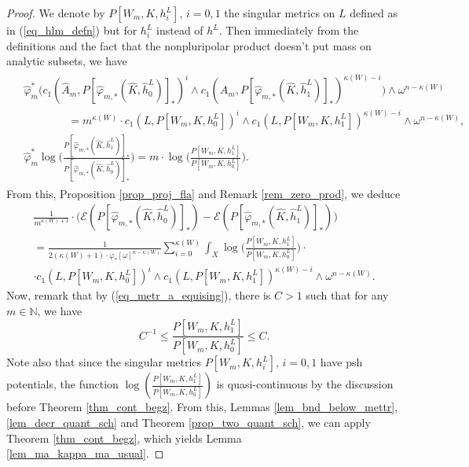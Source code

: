 \documentclass[12pt]{article}
\numberwithin{equation}{section}
\theoremstyle{theorem}
\theoremstyle{definition}
\theoremstyle{remark}
\newcommand{\nat}{\mathbb{N}}
\begin{document}
	\begin{proof}
		We denote by $P[W_m, K, h^L_i]$, $i = 0, 1$ the singular metrics on $L$ defined as in (\ref{eq_hlm_defn}) but for $h^L_i$ instead of $h^L$.
		Then immediately from the definitions and the fact that the nonpluripolar product doesn't put mass on analytic subsets, we have
		\begin{multline}
		\begin{aligned}
			&
			\widehat{\varphi}_m^* \Big( c_1(\widehat{A}_m, P[\widehat{\varphi}_{m, *} (\widehat{K}, \widehat{h}^L_0)]_*)^i \wedge c_1(\widehat{A}_m, P[\widehat{\varphi}_{m, *} (\widehat{K}, \widehat{h}^L_1)]_*)^{\kappa(W) - i} \Big) \wedge \omega^{n - \kappa(W)}
			\\
			&
			\qquad \qquad 
			=
			m^{\kappa(W)} \cdot c_1(L, P[W_m, K, h^L_0])^i \wedge c_1(L, P[W_m, K, h^L_1])^{\kappa(W) - i}  \wedge \omega^{n - \kappa(W)},
			\\
			&
			\widehat{\varphi}_m^*
			\log\Big( \frac{P[\widehat{\varphi}_{m, *} (\widehat{K}, \widehat{h}^L_1)]_*}{P[\widehat{\varphi}_{m, *} (\widehat{K}, \widehat{h}^L_0)]_*} \Big)
			=
			m
			\cdot
			\log\Big( \frac{P[W_m, K, h^L_1]}{P[W_m, K, h^L_0]} \Big).
		\end{aligned}
		\end{multline}
		From this, Proposition \ref{prop_proj_fla} and Remark \ref{rem_zero_prod}, we deduce
		\begin{multline}
			\frac{1}{m^{\kappa(W) + 1}}
			\cdot
			\Big(
			\mathscr{E}(P[\widehat{\varphi}_{m, *} (\widehat{K}, \widehat{h}^L_0)]_*) - \mathscr{E}(P[\widehat{\varphi}_{m, *} (\widehat{K}, \widehat{h}^L_1)]_*)
			\Big)
			\\
			=
			\frac{1}{2(\kappa(W) + 1) \cdot \varphi_{*} [\omega]^{n - \kappa(W)}}
			\sum_{i = 0}^{\kappa(W)} \int_{X} \log\Big( \frac{P[W_m, K, h^L_1]}{P[W_m, K, h^L_0]} \Big)
			\cdot
			\\
			 \cdot c_1(L, P[W_m, K, h^L_0])^i \wedge c_1(L, P[W_m, K, h^L_1])^{\kappa(W) - i}  \wedge \omega^{n - \kappa(W)}.
		\end{multline}
		Now, remark that by (\ref{eq_metr_a_equising}), there is $C > 1$ such that for any $m \in \nat$, we have
		\begin{equation}
			C^{-1}
			\le
			\frac{P[W_m, K, h^L_1]}{P[W_m, K, h^L_0]}
			\leq
			C.
		\end{equation}
		Note also that since the singular metrics $P[W_m, K, h^L_i]$, $i = 0, 1$ have psh potentials, the function $\log( \frac{P[W_m, K, h^L_1]}{P[W_m, K, h^L_0]})$ is quasi-continuous by the discussion before Theorem \ref{thm_cont_begz}.
		From this, Lemmas \ref{lem_bnd_below_mettr}, \ref{lem_decr_quant_sch} and Theorem \ref{prop_two_quant_sch}, we can apply Theorem \ref{thm_cont_begz}, which yields Lemma \ref{lem_ma_kappa_ma_usual}.
	\end{proof}
	
\end{document}
